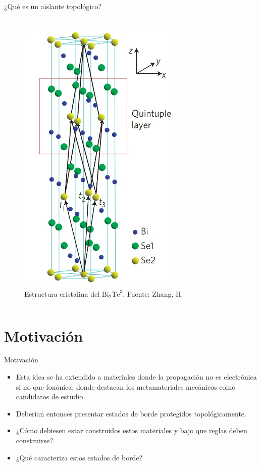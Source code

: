 \documentclass[aspectratio=43]{beamer}
\begin{document}
\begin{frame}{¿Qué es un aislante topológico?}
\begin{columns}[c]
        \begin{figure}
            \centering
            \includegraphics[width=0.7\textwidth]{Aislante topologico ejemplo.jpg}
            \caption{Estructura cristalina del $\mathrm{Bi}_2\mathrm{Te}^3$. Fuente: Zhang, H. } 
            \label{Ejemplo de aislante topologico}
        \end{figure}
        
     \end{columns}
    \end{frame}
     
   
    \section{Motivación}
    \begin{frame}{Motivación}
     \begin{itemize}
         \item Esta idea se ha extendido a materiales donde la propagación no es electrónica si no que fonónica, donde destacan los metamateriales mecánicos como candidatos de estudio.
         \item Deberían entonces presentar estados de borde protegidos topológicamente. 
         \item ¿Cómo debiesen estar construidos estos materiales y bajo que reglas deben construirse?
         \item ¿Qué caracteriza estos estados de borde?
     \end{itemize}   
    \end{frame}
    
\end{document}
